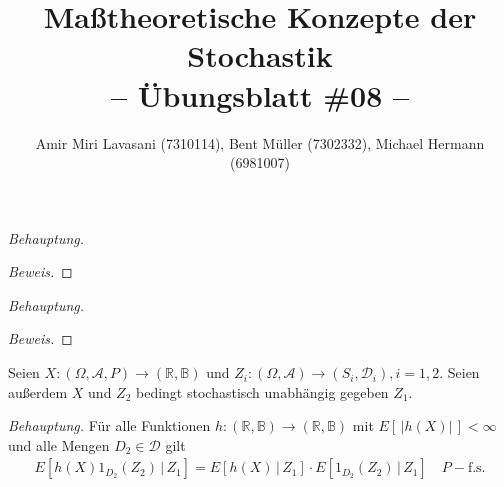 \documentclass[10pt]{article}
\newcommand{\R}{\mathbb{R}}
\newcommand{\A}{\mathcal{A}}
\newcommand{\D}{\mathcal{D}}
\newcommand{\B}{\mathbb{B}}
\newcommand{\gap}{\,\vert\,}
\newcommand{\beh}{\textit{Behauptung. }}
\newenvironment{Aufgabe}[2][Aufgabe]{\begin{trivlist}
\item[\hskip \labelsep {\bfseries #1}\hskip \labelsep {\bfseries #2.}]}{\end{trivlist}}
\begin{document}
 
\title{ \textbf{Maßtheoretische Konzepte der Stochastik \\ -- Übungsblatt \#08 --} }

\author{Amir Miri Lavasani (7310114), Bent Müller (7302332),
        Michael Hermann (6981007)}
\maketitle

\begin{Aufgabe}{1} %
\end{Aufgabe}

\beh

\begin{proof}[Beweis]
\end{proof}

\begin{Aufgabe}{2} %
\end{Aufgabe}

\beh 

\begin{proof}[Beweis]
\end{proof}

\begin{Aufgabe}{3} %
	Seien $X : (\Omega, \A, P)\to (\R, \B)$ und $Z_i : (\Omega, \A)\to (S_i, \D_i), i = 1,2$. Seien außerdem $X$ und $Z_2$
	bedingt stochastisch unabhängig gegeben $Z_1$.
\end{Aufgabe}

\beh Für alle Funktionen $h: (\R,\B)\to (\R,\B)$ mit $E[\,\vert h(X) \vert\,] < \infty$ und alle Mengen $D_2\in\D$ gilt 
	\begin{align*}
		E[h(X)1_{D_2}(Z_2) \,\vert\, Z_1] = E[h(X) \,\vert\, Z_1] \cdot E[1_{D_2}(Z_2) \gap Z_1] \quad\text{$P-$f.s.}
	\end{align*}
\end{document}

